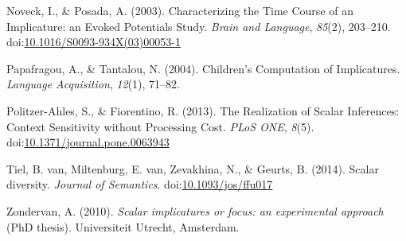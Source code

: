 \documentclass[floatsintext,man]{apa6}
\theoremstyle{definition}
\theoremstyle{definition}
\theoremstyle{definition}
\theoremstyle{remark}
\begin{document}
\hypertarget{ref-Noveck2003}{}
Noveck, I., \& Posada, A. (2003). Characterizing the Time Course of an
Implicature: an Evoked Potentials Study. \emph{Brain and Language},
\emph{85}(2), 203--210.
doi:\href{https://doi.org/10.1016/S0093-934X(03)00053-1}{10.1016/S0093-934X(03)00053-1}

\hypertarget{ref-Papafragou2004}{}
Papafragou, A., \& Tantalou, N. (2004). Children's Computation of
Implicatures. \emph{Language Acquisition}, \emph{12}(1), 71--82.

\hypertarget{ref-Politzer-Ahles2013}{}
Politzer-Ahles, S., \& Fiorentino, R. (2013). The Realization of Scalar
Inferences: Context Sensitivity without Processing Cost. \emph{PLoS
ONE}, \emph{8}(5).
doi:\href{https://doi.org/10.1371/journal.pone.0063943}{10.1371/journal.pone.0063943}

\hypertarget{ref-VanTiel2014}{}
Tiel, B. van, Miltenburg, E. van, Zevakhina, N., \& Geurts, B. (2014).
Scalar diversity. \emph{Journal of Semantics}.
doi:\href{https://doi.org/10.1093/jos/ffu017}{10.1093/jos/ffu017}

\hypertarget{ref-Zondervan2010}{}
Zondervan, A. (2010). \emph{Scalar implicatures or focus: an
experimental approach} (PhD thesis). Universiteit Utrecht, Amsterdam.
\end{document}
